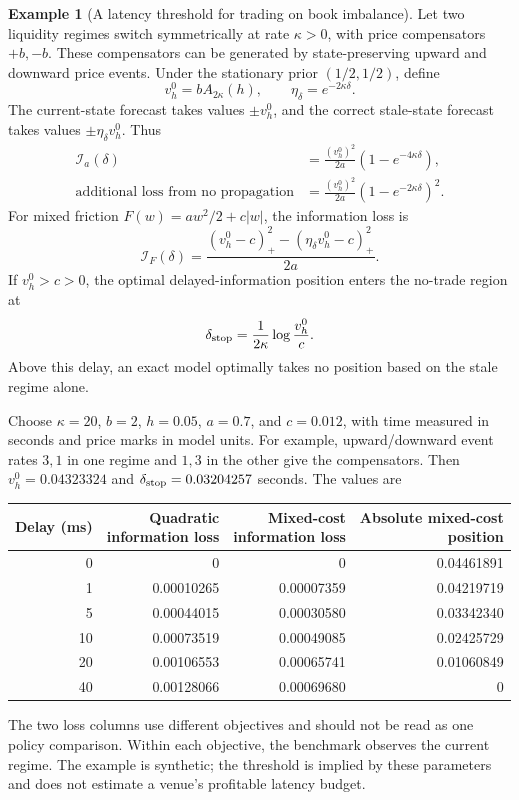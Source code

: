 \documentclass[11pt]{article}
\theoremstyle{plain}
\theoremstyle{definition}
\newtheorem{example}[theorem]{Example}
\theoremstyle{remark}
\begin{document}
\begin{example}[A latency threshold for trading on book imbalance]
\label{ex:latencyfrontier}
Let two liquidity regimes switch symmetrically at rate
\(\kappa>0\), with price compensators \(+b,-b\).
These compensators can be generated by state-preserving upward
and downward price events. Under the stationary prior
\((1/2,1/2)\), define
\[
 v_h^0=bA_{2\kappa}(h),\qquad
 \eta_\delta=e^{-2\kappa\delta}.
\]
The current-state forecast takes values \(\pm v_h^0\), and the
correct stale-state forecast takes values
\(\pm\eta_\delta v_h^0\). Thus
\begin{align*}
 \mathcal I_a(\delta)
 &=\frac{(v_h^0)^2}{2a}(1-e^{-4\kappa\delta}),\\
 \text{additional loss from no propagation}
 &=\frac{(v_h^0)^2}{2a}(1-e^{-2\kappa\delta})^2.
\end{align*}
For mixed friction \(F(w)=aw^2/2+c|w|\), the information loss is
\[
 \mathcal I_F(\delta)=
 \frac{(v_h^0-c)_+^2-(\eta_\delta v_h^0-c)_+^2}{2a}.
\]
If \(v_h^0>c>0\), the optimal delayed-information position
enters the no-trade region at
\[
 \delta_{\rm stop}=\frac1{2\kappa}\log\frac{v_h^0}{c}.
\]
Above this delay, an exact model optimally takes no position
based on the stale regime alone.

Choose \(\kappa=20\), \(b=2\), \(h=0.05\), \(a=0.7\), and
\(c=0.012\), with time measured in seconds and price marks in
model units. For example, upward/downward event rates \(3,1\)
in one regime and \(1,3\) in the other give the compensators.
Then \(v_h^0=0.04323324\) and
\(\delta_{\rm stop}=0.03204257\) seconds. The values are
\begin{center}
\begin{tabular}{@{}rrrr@{}}
\toprule
Delay (ms)&\shortstack{Quadratic\\information loss}
 &\shortstack{Mixed-cost\\information loss}
 &\shortstack{Absolute mixed-cost\\position}\\
\midrule
0&0&0&0.04461891\\
1&0.00010265&0.00007359&0.04219719\\
5&0.00044015&0.00030580&0.03342340\\
10&0.00073519&0.00049085&0.02425729\\
20&0.00106553&0.00065741&0.01060849\\
40&0.00128066&0.00069680&0\\
\bottomrule
\end{tabular}
\end{center}
The two loss columns use different objectives and should not be
read as one policy comparison. Within each objective, the
benchmark observes the current regime. The example is synthetic;
the threshold is implied by these parameters and does not estimate
a venue's profitable latency budget.


\end{example}
\end{document}
